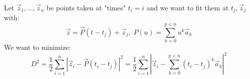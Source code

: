 \documentclass[aps,12pt]{revtex4}
\begin{document}
Let $\vec{z}_1,\ldots,\vec{z}_n$ be points taken at "times" $t_i=i$ and
we want to fit them at $t_j,\vec{z}_j$ with:
\begin{equation}
	\vec{z} = \vec{P}(t-t_j) + \vec{z}_j, \; P(u) = \sum_{k=0}^{p<n} u^k \vec{a}_k
\end{equation}
We want to minimize:
\begin{equation}
	D^2 = \dfrac{1}{2} \sum_{i=1}^n \left\vert
	\vec{z}_i - \vec{P}(t_i-t_j)
	\right\vert^2 = \dfrac{1}{2} \sum_{i=1}^n \left\vert \vec{z}_i - \sum_{k=0}^{p<n} (t_i-t_j)^k \vec{a}_k
	\right\vert^2
\end{equation}
\end{document}

